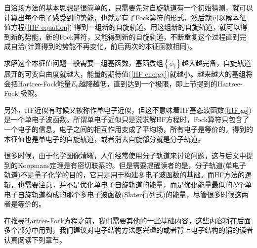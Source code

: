 \documentclass[12pt,a4paper,openany,twoside]{book}
\numberwithin{equation}{section}
\begin{document}
          自洽场方法的基本思想是很简单的，只需要先对自旋轨道有一个初始猜测，就可以计算出每个电子感受到的势能，也就是有了Fock算符的形式，然后就可以解本征值方程(\ref{HF equation}) 得到一组新的自旋轨道。用这组新的自旋轨道，就可以得到新的势能，新的Fock算符，又能得到新的自旋轨道，不断重复这个过程直到完成自洽(计算得到的势能不再变化，前后两次的本征函数相同)。
          
          求解这个本征值问题一般需要一组基函数，基函数组$\left\{\phi_i\right\}$越大越完备，自旋轨道展开的可变自由度就越大，能量的期待值(\ref{HF energy})就越小。越来越大的基组将会把Hartree-Fock能量$E_0$越降越低，直到达到一个极限，即上节提到的Hartree-Fock 极限。

          另外，HF近似有时候又被称作单电子近似，但这不意味着HF基态波函数(\ref{HF gs})是一个单电子波函数。所谓单电子近似只是说求解HF方程时，Fock算符只包含了一个电子的信息，电子之间的相互作用变成了平均场，所有电子是等价的，得到的本征值也是单电子的自旋轨道，或者消去自旋部分就是分子轨道。
          
          很多时候，由于化学图像清晰，人们经常使用分子轨道来讨论问题，这与后文中提到的Koopmans定理是有密切联系的。但是需要提醒读者的是，分子轨道(单电子轨道)不是量子化学的目的，它只是用于构建多电子波函数的基础。而HF方法的逻辑，也需要注意，并不是优化单电子自旋轨道的能量，而是优化能量最低的$N$个单电子自旋轨道构成的那个多电子波函数(Slater行列式)的能量，尽管很多时候这两者是等价的。

          在推导Hartree-Fock方程之前，我们需要其他的一些基础内容，这些内容将在后面多个部分中用到，我们建议对电子结构方法感兴趣的\sout{或者背上电子结构的锅的}读者认真阅读下列章节。
          
\end{document}
